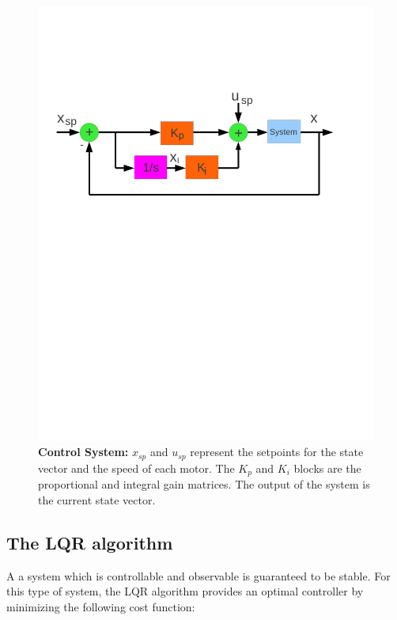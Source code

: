 \documentclass[conference]{IEEEtran}
\begin{document}
\begin{figure}
\vspace{-60pt}
	\centering
	\includegraphics[width=1\columnwidth]{./pics_paper/diagrama_bloques_eng.pdf}
\vspace{-180pt}
	\caption{\textbf{Control System:} $x_{sp}$ and $u_{sp}$ represent the setpoints for the state vector and the speed of each motor. The $K_p$ and $K_i$ blocks are the proportional and integral gain matrices. The output of the system is the current state vector.}
	\label{fig:diagrama_bloques_eng.pdf}
\end{figure}

\subsection{The LQR algorithm}
\label{sec:lqr}

A a system which is controllable and observable is guaranteed to be stable\cite{bib:hakas}. For this type of system, the LQR algorithm provides an optimal controller\cite{bib:lqrnotes} by minimizing the following cost function:
\end{document}
